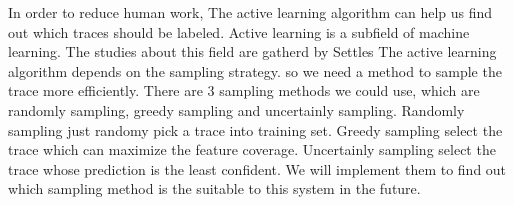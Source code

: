 In order to reduce human work,
The active learning algorithm can help us find out which traces should be labeled.
Active learning is a subfield of machine learning.
The studies about this field are gatherd by Settles\cite{ActiveLearning}
The active learning algorithm depends on the sampling strategy.
so we need a method to sample the trace more efficiently.
There are 3 sampling methods we could use, which are randomly sampling, greedy sampling and uncertainly sampling.
Randomly sampling just randomy pick a trace into training set.
Greedy sampling select the trace which can maximize the feature coverage.
Uncertainly sampling  select the trace whose prediction is the least confident.
We will implement them to find out which sampling method is the suitable to this system in the future.



